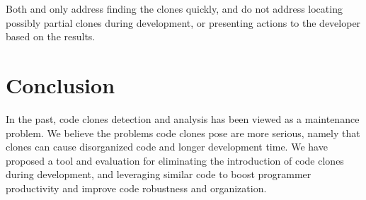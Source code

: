 \documentclass[preprint,10pt]{sigplanconf}
\begin{document}
Both \cite{Keivanloo2011} and \cite{Lee2010} only address finding the
clones quickly, and do not address locating possibly partial clones
during development, or presenting actions to the developer based on
the results.

\section{Conclusion}
\label{sec:conclusion}

In the past, code clones detection and analysis has been viewed as a
maintenance problem. 
We believe the problems code clones pose are 
more serious, namely that clones can cause disorganized code and
longer development time.
We have proposed a tool and evaluation for
eliminating the introduction of code clones during development, and
leveraging similar code to boost programmer productivity and improve
code robustness and organization.

%

%
%
\end{document}
